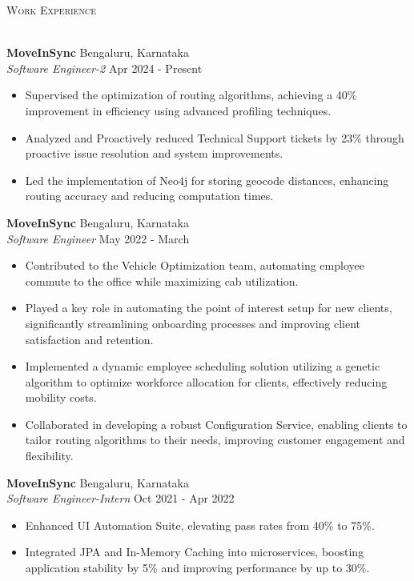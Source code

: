 \documentclass[a4paper]{article}
\newcommand{\lineunder} {
    \vspace*{-8pt} \\
    \hspace*{-18pt} \hrulefill \\
}
\newcommand{\header} [1] {
    {\hspace*{-18pt}\vspace*{6pt} \textsc{#1}}
    \vspace*{-6pt} \lineunder
}
\begin{document}
\header{Work Experience}
\vspace{1mm}

\textbf{MoveInSync} \hfill Bengaluru, Karnataka\\
\textit{Software Engineer-2} \hfill Apr 2024 - Present\\
\vspace{-1mm}
\begin{itemize} \itemsep 0pt
    \item Supervised the optimization of routing algorithms, achieving a 40\% improvement in efficiency using advanced profiling techniques.
    \item Analyzed and Proactively reduced Technical Support tickets by 23\% through proactive issue resolution and system improvements.
    \item Led the implementation of Neo4j for storing geocode distances, enhancing routing accuracy and reducing computation times.
\end{itemize}
\textbf{MoveInSync} \hfill Bengaluru, Karnataka\\
\textit{Software Engineer} \hfill May 2022 - March\\
\vspace{-1mm}
\begin{itemize} \itemsep 0pt
	\item Contributed to the Vehicle Optimization team, automating employee commute to the office while maximizing cab utilization.
    \item Played a key role in automating the point of interest setup for new clients, significantly streamlining onboarding processes and improving client satisfaction and retention.
	\item Implemented a dynamic employee scheduling solution utilizing a genetic algorithm to optimize workforce allocation for clients, effectively reducing mobility costs.
\item Collaborated in developing a robust Configuration Service, enabling clients to tailor routing algorithms to their needs, improving customer engagement and flexibility.
\end{itemize}
\textbf{MoveInSync} \hfill Bengaluru, Karnataka\\
\textit{Software Engineer-Intern} \hfill Oct 2021 - Apr 2022\\
\vspace{-1mm}
\begin{itemize} \itemsep 0pt
	\item Enhanced UI Automation Suite, elevating pass rates from 40\% to 75\%.
	\item Integrated JPA and In-Memory Caching into microservices, boosting application stability by 5\% and improving performance by up to 30\%.
\end{itemize}
\end{document}
